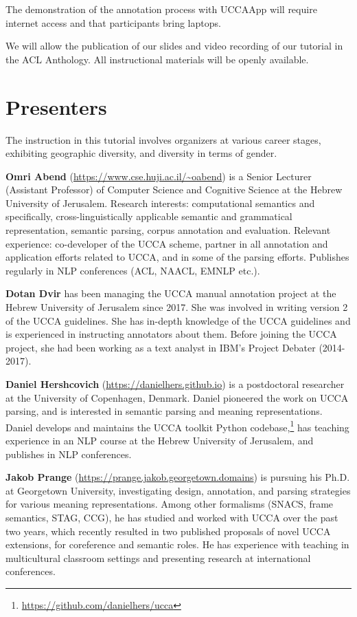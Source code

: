 \documentclass[11pt,a4paper,table]{article}
\begin{document}
The demonstration of the annotation process with
UCCAApp \cite{abend2017uccaapp} will require internet access
and that participants bring laptops.

We will allow the publication of our slides and video recording of our tutorial in the ACL Anthology.
All instructional materials will be openly available.

\section{Presenters}\label{sec:instructors}

The instruction in this tutorial involves organizers at various
career stages, exhibiting geographic diversity, and diversity in terms of 
gender.

\textbf{Omri Abend} (\url{https://www.cse.huji.ac.il/~oabend})
is a Senior Lecturer (Assistant Professor) of Computer Science and Cognitive Science
at the Hebrew University of Jerusalem.
Research interests:
computational semantics and specifically, cross-linguistically applicable
semantic and grammatical representation, semantic parsing, corpus annotation and evaluation.
Relevant experience: co-developer of the UCCA scheme, partner in all annotation and application efforts related to UCCA, and in some of the parsing efforts. Publishes regularly in NLP conferences (ACL, NAACL, EMNLP etc.).

\textbf{Dotan Dvir} has been managing the UCCA manual annotation project at the Hebrew University of Jerusalem since 2017. She was involved in writing version 2 of the UCCA guidelines. She has in-depth knowledge of the UCCA guidelines and is experienced in instructing annotators about them. Before joining the UCCA project, she had been working as a text analyst in IBM's Project Debater (2014-2017).

\textbf{Daniel Hershcovich} (\url{https://danielhers.github.io})
is a postdoctoral researcher at the University of Copenhagen, Denmark.
Daniel pioneered the work on UCCA parsing, and
is interested in semantic parsing and meaning representations.
Daniel develops and maintains the UCCA toolkit Python codebase,\footnote{\url{https://github.com/danielhers/ucca}}
has teaching experience in an NLP course
at the Hebrew University of Jerusalem,
and publishes in NLP conferences.

\textbf{Jakob Prange} (\url{https://prange.jakob.georgetown.domains})
is pursuing his Ph.D. at Georgetown University, investigating design, annotation, and parsing strategies for various meaning representations.
Among other formalisms (SNACS, frame semantics, STAG, CCG), he has studied and worked with UCCA over the past two years, which recently resulted in two published proposals of novel UCCA extensions, for coreference and semantic roles.
He has experience with teaching in multicultural classroom settings and presenting research at international conferences.
\end{document}
